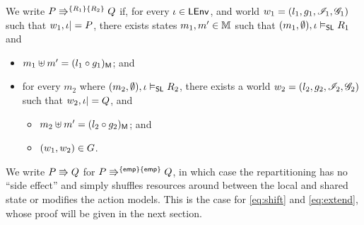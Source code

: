 \begin{definition}[Repartitioning] \label{def:repartitioning}
  We write $\repartitions{P}{Q}{R_1}{R_2}$ if, for every $\lenv \in
  \LEnv$, and world $w_1 = (l_1,g_1,\lmod_1,\gmod_1)$ such that $w_1,
  \lenv |= P$, there exists states $m_1,m' \in \Heaps$ such that
  $(m_1, \emptyset), \lenv \slsat R_1$ and
\begin{itemize} 
\item $m_1 \composeH m' = \heapPart{(l_1\composeL g_1)}$; and
\item for every $m_2$ where $(m_2, \emptyset), \lenv \slsat R_2$,
  there exists a world $w_2 = (l_2,g_2,\lmod_2,\gmod_2)$ such that
  $w_2, \lenv |= Q$, and
  \begin{itemize}
  \item $m_2 \composeH m' = \heapPart{(l_2 \composeL g_2)}$; and
  \item $(w_1, w_2) \in \guarantee$.
  \end{itemize}
\end{itemize}
\end{definition}

We write $P \semimplies Q$ for $\repartitions{P}{Q}{\emp}{\emp} $, in
which case the repartitioning has no ``side effect'' and simply
shuffles resources around between the local and shared state or
modifies the action models. This is the case for \eqref{eq:shift} and
\eqref{eq:extend}, whose proof will be given in the next section.

%	
%
%

